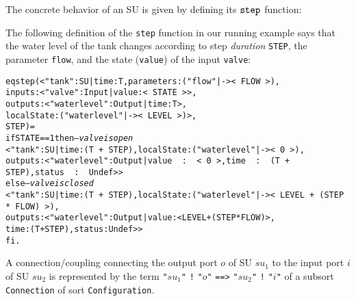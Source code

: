 

The concrete behavior of an SU is given by defining its $\mathtt{step}_{}$
function:

\begin{example}
The following definition of the \texttt{step} function in our running
example says that  the water level of the tank changes according to
step \emph{duration} \texttt{STEP}, the parameter \texttt{flow}, and the
state (\texttt{value}) of the input \texttt{valve}:

\scriptsize
\begin{alltt}
eq step(< "tank" : SU | time : T, parameters : ("flow" |-> <\,FLOW\,>), 
                        inputs : < "valve" : Input | value : <\,STATE\,> >, 
                        outputs : < "waterlevel" : Output | time : T >,
                        localState : ("waterlevel" |-> <\,LEVEL\,>) >,
        STEP) = 
  if STATE == 1 then    \emph{--- valve is open}
    < "tank" : SU | time : (T\,+\,STEP), localState : ("waterlevel" |-> <\,0\,>),
          outputs : < "waterlevel" : Output | value\,\,:\,\,<\,0\,>, time\,\,:\,\,(T\,+\,STEP), status\,\,:\,\,Undef > >
  else                  \emph{--- valve is closed}
    < "tank" : SU | time : (T\,+\,STEP),  localState : ("waterlevel" |-> <\,LEVEL\,+\,(STEP\,*\,FLOW)\,>), 
                    outputs : < "waterlevel" : Output | value : < LEVEL + (STEP * FLOW) >, 
                                                        time : (T + STEP), status : Undef > > 
  fi .
\end{alltt}
\normalsize
\end{example}

A connection/coupling connecting the output port $o$ of SU $\mathit{su}_1$ to
the input port $i$ of SU $\mathit{su}_2$ is represented by the term
\texttt{"}$\mathit{su}_1$\texttt{"} \texttt{!} \texttt{"}$o$\texttt{"} \texttt{==>}
\texttt{"}$\mathit{su}_2$\texttt{"} \texttt{!} \texttt{"}$i$\texttt{"} of a subsort
\texttt{Connection} of sort \texttt{Configuration}.


